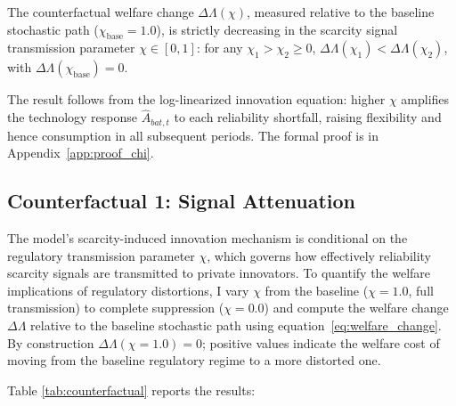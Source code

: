 	\begin{proposition} \label{prop:chi_monotonicity}
		The counterfactual welfare change $\Delta\Lambda(\chi)$, measured relative to the baseline stochastic path ($\chi_{\text{base}} = 1.0$), is strictly decreasing in the scarcity signal transmission parameter $\chi \in [0,1]$: for any $\chi_1 > \chi_2 \geq 0$, $\Delta\Lambda(\chi_1) < \Delta\Lambda(\chi_2)$, with $\Delta\Lambda(\chi_{\text{base}}) = 0$.
	\end{proposition}

	
	\noindent The result follows from the log-linearized innovation equation: higher $\chi$ amplifies the technology response $\hat{A}_{bat,t}$ to each reliability shortfall, raising flexibility and hence consumption in all subsequent periods. The formal proof is in Appendix~\ref{app:proof_chi}.

	\subsection{Counterfactual 1: Signal Attenuation}

	The model's scarcity-induced innovation mechanism is conditional on the regulatory transmission parameter $\chi$, which governs how effectively reliability scarcity signals are transmitted to private innovators. To quantify the welfare implications of regulatory distortions, I vary $\chi$ from the baseline ($\chi = 1.0$, full transmission) to complete suppression ($\chi = 0.0$) and compute the welfare change $\Delta\Lambda$ relative to the baseline stochastic path using equation~\eqref{eq:welfare_change}. By construction $\Delta\Lambda(\chi = 1.0) = 0$; positive values indicate the welfare cost of moving from the baseline regulatory regime to a more distorted one.

	Table \ref{tab:counterfactual} reports the results:

